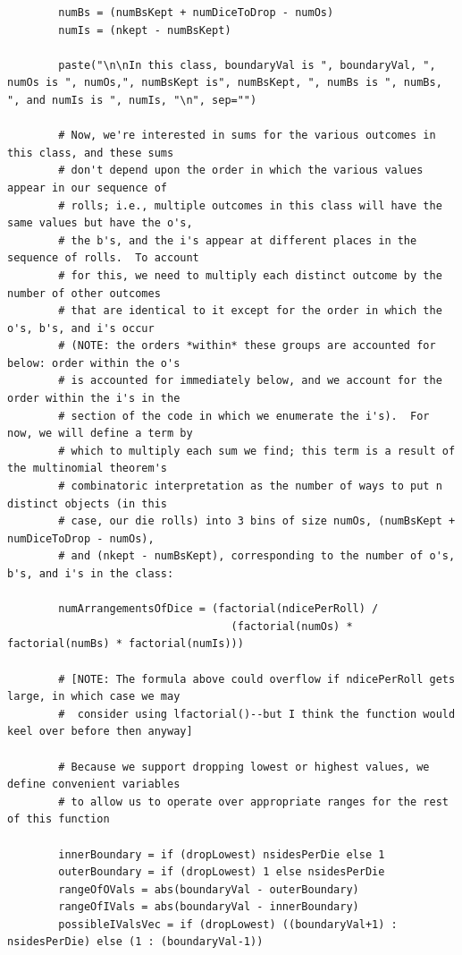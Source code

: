 \documentclass[12pt]{article}
\begin{document}
\begin{lstlisting}
        numBs = (numBsKept + numDiceToDrop - numOs)
        numIs = (nkept - numBsKept)
        
        paste("\n\nIn this class, boundaryVal is ", boundaryVal, ", numOs is ", numOs,", numBsKept is", numBsKept, ", numBs is ", numBs, ", and numIs is ", numIs, "\n", sep="")
        
        # Now, we're interested in sums for the various outcomes in this class, and these sums
        # don't depend upon the order in which the various values appear in our sequence of
        # rolls; i.e., multiple outcomes in this class will have the same values but have the o's,
        # the b's, and the i's appear at different places in the sequence of rolls.  To account
        # for this, we need to multiply each distinct outcome by the number of other outcomes
        # that are identical to it except for the order in which the o's, b's, and i's occur
        # (NOTE: the orders *within* these groups are accounted for below: order within the o's 
        # is accounted for immediately below, and we account for the order within the i's in the
        # section of the code in which we enumerate the i's).  For now, we will define a term by
        # which to multiply each sum we find; this term is a result of the multinomial theorem's 
        # combinatoric interpretation as the number of ways to put n distinct objects (in this 
        # case, our die rolls) into 3 bins of size numOs, (numBsKept + numDiceToDrop - numOs), 
        # and (nkept - numBsKept), corresponding to the number of o's, b's, and i's in the class:
        
        numArrangementsOfDice = (factorial(ndicePerRoll) / 
                                   (factorial(numOs) * factorial(numBs) * factorial(numIs)))
        
        # [NOTE: The formula above could overflow if ndicePerRoll gets large, in which case we may
        #  consider using lfactorial()--but I think the function would keel over before then anyway]
        
        # Because we support dropping lowest or highest values, we define convenient variables
        # to allow us to operate over appropriate ranges for the rest of this function
        
        innerBoundary = if (dropLowest) nsidesPerDie else 1
        outerBoundary = if (dropLowest) 1 else nsidesPerDie
        rangeOfOVals = abs(boundaryVal - outerBoundary)
        rangeOfIVals = abs(boundaryVal - innerBoundary)
        possibleIValsVec = if (dropLowest) ((boundaryVal+1) : nsidesPerDie) else (1 : (boundaryVal-1))
        

\end{lstlisting}
\end{document}
